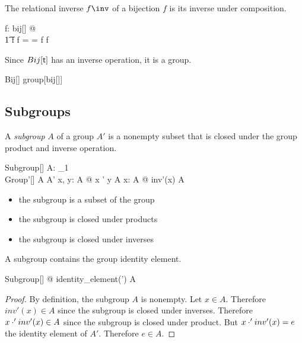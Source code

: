 \documentclass{amsart}
\begin{document}
\begin{remark}
The relational inverse $f \inv$ of a bijection $f$ is its inverse under composition.

\begin{zed}
	\forall f: bij[\setT] @ \\
	\t1	f \circ f \inv = \id \setT = f \inv \circ f
\end{zed}

Since $Bij[\mathsf{t}]$ has an inverse operation, it is a group.

\begin{zed}
	Bij[\setT] \in group[bij[\setT]]
\end{zed}

\end{remark}

\subsection{Subgroups}

A \textit{subgroup} $A$ of a group $A'$ is a nonempty subset that is closed under the group product and inverse operation.

\begin{schema}{Subgroup}[\genT]
	A: \power_1 \genT \\
	Group'[\genT]
\where
	A \subseteq A'
\also
	\forall x, y: A @ x \opG' y \in A
\also
	\forall x: A @ inv'(x) \in A
\end{schema}

\begin{itemize}
	\item the subgroup is a subset of the group
	\item the subgroup is closed under products
	\item the subgroup is closed under inverses
\end{itemize}

\begin{remark}
A subgroup contains the group identity element.

\begin{zed}
	\forall Subgroup[\setT] @ identity\_element(\strucA') \in A
\end{zed}

\begin{proof}
By definition, the subgroup $A$ is nonempty. Let $x \in A$.
Therefore $inv'(x) \in A$ since the subgroup is closed under inverses.
Therefore $x \mathbin{\cdot}' inv'(x) \in A$ since the subgroup is closed under product.
But $x \mathbin{\cdot}' inv'(x) = e$ the identity element of $A'$. Therefore $e \in A$.
\end{proof}

\end{remark}
\end{document}
